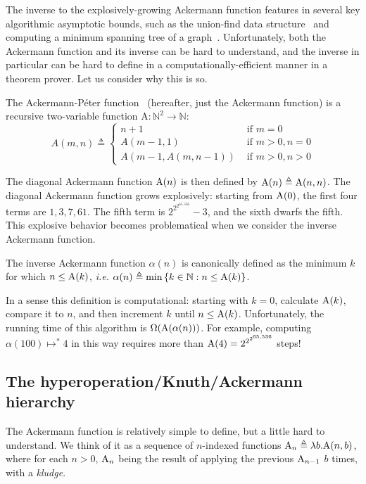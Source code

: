 The inverse to the
explosively-growing Ackermann function features in several key algorithmic asymptotic
bounds, such as the union-find data structure~\cite{tarjan} and computing a minimum spanning 
tree of a graph~\cite{chazelle}.  Unfortunately, both the Ackermann function and its inverse 
can be hard to understand, and the inverse in particular can be hard to define in a computationally-efficient manner in a theorem prover.  Let us consider why this
is so.
\begin{defn} \label{defn: ack}
The Ackermann-P\'eter function~\cite{blah} (hereafter, just the Ackermann function) is a recursive two-variable
function $\text{A} : \mathbb{N}^2 \to \mathbb{N}$:
\begin{equation}
A(m, n) \triangleq \begin{cases}
n + 1 & \text{ if } m = 0 \\
A(m-1, 1) & \text{ if } m > 0, n = 0 \\
A(m-1, A(m, n-1)) & \text{ if } m > 0, n > 0
\end{cases}
\end{equation}
\end{defn}
The diagonal Ackermann function $\text{A}(n)$ is then defined by $\text{A}(n) \triangleq \text{A}(n, n)$.	
The diagonal Ackermann function grows explosively: starting from $\text{A}(0)$, the first four terms are $1, 3, 7, 61$.  The fifth term is $2^{2^{2^{65,536}}}-3$, and the sixth dwarfs the fifth.
This explosive behavior becomes problematical when we consider
the inverse Ackermann function\cite{blah}.
\begin{defn} \label{defn: inv_ack}
The inverse Ackermann function $\alpha(n)$ is canonically defined as the minimum $k$ for which $n \le \text{A}(k)$, \emph{i.e.} $\alpha(n) \triangleq \min\left\{k\in \mathbb{N} : n \le \text{A}(k)\right\}$.
\end{defn}
In a sense this definition is computational: starting with $k=0$, calculate $\text{A}(k)$, compare
it to $n$, and then increment $k$ until $n \le \text{A}(k)$.  
Unfortunately, the running time of this algorithm is $\Omega(\text{A}(\alpha(n)))$.
For example, computing $\alpha(100) \mapsto^{*} 4$ in this way requires 
more than $\text{A}(4) = 2^{2^{2^{65,536}}}$ steps!

\subsection{The hyperoperation/Knuth/Ackermann hierarchy}

The Ackermann function is relatively simple to define, but a little hard to understand.  We think of it as a sequence of $n$-indexed functions $\text{A}_n \triangleq \lambda b.\text{A}(n,b)$, where for each $n>0$, $\text{A}_n$ being the result of applying the previous $\text{A}_{n-1}$ $b$ times, with a \emph{kludge}.

